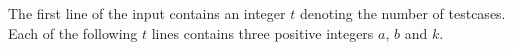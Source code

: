 The first line of the input contains an integer $t$ denoting the number of testcases.
Each of the following $t$ lines contains three positive integers $a$, $b$ and $k$. 